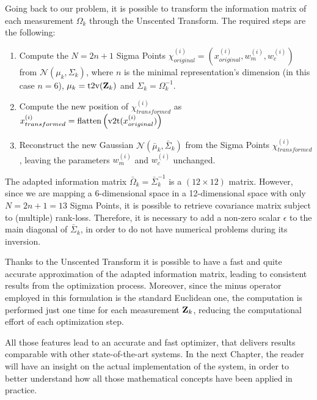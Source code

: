 Going back to our problem, it is possible to transform the information matrix of each measurement $\Omega_k$ through the Unscented Transform. The required steps are the following:

\begin{enumerate}
    \item Compute the $N = 2n+1$ Sigma Points $\chi_{original}^{(i)} = (x_{original}^{(i)}, w_m^{(i)}, w_c^{(i)})$ from $\mathcal{N}(\mu_k, \Sigma_k)$, where $n$ is the minimal representation's dimension (in this case $n = 6$), $\mu_k = \text{t2v}(\mathbf{Z}_{k})$ and $\Sigma_k = \Omega_k^{-1}$.
    \item Compute the new position of $\chi_{transformed}^{(i)}$ as $x_{transformed}^{(i)} = \flatten{\v2t(x_{original}^{(i)})}$
    \item Reconstruct the new Gaussian $\mathcal{N}(\bar{\mu}_k, \bar{\Sigma}_k)$ from the Sigma Points $\chi_{transformed}^{(i)}$, leaving the parameters $w_m^{(i)}$ and $w_c^{(i)}$ unchanged.
\end{enumerate}

The adapted information matrix $\bar{\Omega}_k = \bar{\Sigma}_k^{-1}$ is a $(12\times12)$ matrix. However, since we are mapping a 6-dimensional space in a 12-dimensional space with only $N = 2n + 1 = 13$ Sigma Points, it is possible to retrieve covariance matrix subject to (multiple) rank-loss. Therefore, it is necessary to add a non-zero scalar $\epsilon$ to the main diagonal of $\bar{\Sigma}_k$, in order to do not have numerical problems during its inversion.

Thanks to the Unscented Transform it is possible to have a fast and quite accurate approximation of the adapted information matrix, leading to consistent results from the optimization process. Moreover, since the minus operator employed in this formulation is the standard Euclidean one, the computation is performed just one time for each measurement $\mathbf{Z}_{k}$, reducing the computational effort of each optimization step.

\vspace{15px}

All those features lead to an accurate and fast optimizer, that delivers results comparable with other state-of-the-art systems. In the next Chapter, the reader will have an insight on the actual implementation of the system, in order to better understand how all those mathematical concepts have been applied in practice.
